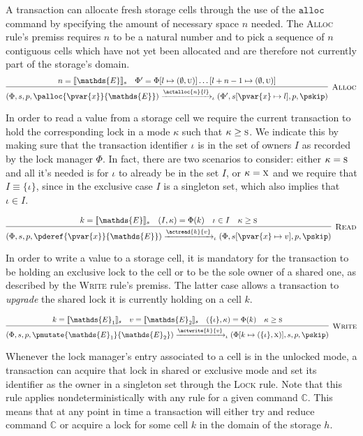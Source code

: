 A transaction can allocate fresh storage cells through the use of the $\mathtt{alloc}$ command by specifying the amount of necessary space $n$ needed. The \textsc{Alloc} rule's premiss requires $n$ to be a natural number and to pick a sequence of $n$ contiguous cells which have not yet been allocated and are therefore not currently part of the storage's domain.
\[
\infer[\textsc{Alloc}]
{
	(\Phi, s, p, \palloc{\pvar{x}}{\mathds{E}})
	\xrightarrow{\actalloc{n}{l}}_\iota
	(\Phi', s[\pvar{x} \mapsto l], p, \pskip)
}
{
	n = \llbracket \mathds{E} \rrbracket_s &
	\Phi' = \Phi[l \mapsto (\emptyset, \textsc{u})]\ldots[l + n - 1 \mapsto (\emptyset, \textsc{u})]
}
\]

In order to read a value from a storage cell we require the current transaction to hold the corresponding lock in a mode $\kappa$ such that $\kappa \geq \textsc{s}$. We indicate this by making sure that the transaction identifier $\iota$ is in the set of owners $I$ as recorded by the lock manager $\Phi$. In fact, there are two scenarios to consider: either $\kappa = \textsc{s}$ and all it's needed is for $\iota$ to already be in the set $I$, or $\kappa = \textsc{x}$ and we require that $I \equiv \{ \iota \}$, since in the exclusive case $I$ is a singleton set, which also implies that $\iota \in I$.

\[
\infer[\textsc{Read}]
{
	(\Phi, s, p, \pderef{\pvar{x}}{\mathds{E}})
	\xrightarrow{\actread{k}{v}}_\iota
	(\Phi, s[\pvar{x} \mapsto v], p, \pskip)
}
{
	k = \llbracket \mathds{E} \rrbracket_s &
	(I, \kappa) = \Phi(k) &
	\iota \in I &
	\kappa \geq \textsc{s}
}
\]

In order to write a value to a storage cell, it is mandatory for the transaction to be holding an exclusive lock to the cell or to be the sole owner of a shared one, as described by the \textsc{Write} rule's premiss. The latter case allows a transaction to \textit{upgrade} the shared lock it is currently holding on a cell $k$.

\[
\infer[\textsc{Write}]
{
	(\Phi, s, p, \pmutate{\mathds{E}_1}{\mathds{E}_2})
	\xrightarrow{\actwrite{k}{v}}_\iota
	(\Phi[k \mapsto (\{\iota\}, \textsc{x})], s, p, \pskip)
}
{
	k = \llbracket \mathds{E}_1 \rrbracket_s &
	v = \llbracket \mathds{E}_2 \rrbracket_s &
	(\{ \iota \}, \kappa) = \Phi(k) &
	\kappa \geq \textsc{s}
}
\]

Whenever the lock manager's entry associated to a cell is in the unlocked mode, a transaction can acquire that lock in shared or exclusive mode and set its identifier as the owner in a singleton set through the \textsc{Lock} rule. Note that this rule applies nondeterministically with any rule for a given command $\mathds{C}$. This means that at any point in time a transaction will either try and reduce command $\mathds{C}$ or acquire a lock for some cell $k$ in the domain of the storage $h$.

